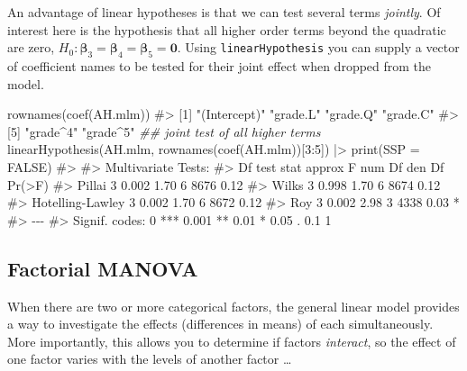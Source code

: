 \documentclass[
  letterpaper,
  10pt,
  krantz2]{krantz}
\makeatletter
\newenvironment{Shaded}{\begin{snugshade}}{\end{snugshade}}
\newcommand{\AttributeTok}[1]{\textcolor[rgb]{0.40,0.45,0.13}{#1}}
\newcommand{\CommentTok}[1]{\textcolor[rgb]{0.37,0.37,0.37}{#1}}
\newcommand{\ConstantTok}[1]{\textcolor[rgb]{0.56,0.35,0.01}{#1}}
\newcommand{\DecValTok}[1]{\textcolor[rgb]{0.68,0.00,0.00}{#1}}
\newcommand{\DocumentationTok}[1]{\textcolor[rgb]{0.37,0.37,0.37}{\textit{#1}}}
\newcommand{\FunctionTok}[1]{\textcolor[rgb]{0.28,0.35,0.67}{#1}}
\newcommand{\NormalTok}[1]{\textcolor[rgb]{0.00,0.23,0.31}{#1}}
\newcommand{\SpecialCharTok}[1]{\textcolor[rgb]{0.37,0.37,0.37}{#1}}
\newenvironment{kframe}{%
  \medskip{}
  \setlength{\fboxsep}{.8em}
  \def\at@end@of@kframe{}%
  \ifinner\ifhmode%
  \def\at@end@of@kframe{\end{minipage}}%
  \begin{minipage}{\columnwidth}%
  \fi\fi%
  \def\FrameCommand##1{\hskip\@totalleftmargin \hskip-\fboxsep
  \colorbox{shadecolor}{##1}\hskip-\fboxsep
      \hskip-\linewidth \hskip-\@totalleftmargin \hskip\columnwidth}%
  \MakeFramed {\advance\hsize-\width
    \@totalleftmargin\z@ \linewidth\hsize
    \@setminipage}}%
{\par\unskip\endMakeFramed%
  \at@end@of@kframe}
\renewenvironment{Shaded}{\begin{kframe}}{\end{kframe}}
\makeatother
\begin{document}
An advantage of linear hypotheses is that we can test several terms
\emph{jointly}. Of interest here is the hypothesis that all higher order
terms beyond the quadratic are zero,
\(H_0 : \boldsymbol{\beta}_3 =  \boldsymbol{\beta}_4 =  \boldsymbol{\beta}_5 = \boldsymbol{0}\).
Using \texttt{linearHypothesis} you can supply a vector of coefficient
names to be tested for their joint effect when dropped from the model.

\begin{Shaded}
\begin{Highlighting}[]
\FunctionTok{rownames}\NormalTok{(}\FunctionTok{coef}\NormalTok{(AH.mlm))}
\CommentTok{\#\textgreater{} [1] "(Intercept)" "grade.L"     "grade.Q"     "grade.C"    }
\CommentTok{\#\textgreater{} [5] "grade\^{}4"     "grade\^{}5"}
\DocumentationTok{\#\# joint test of all higher terms}
\FunctionTok{linearHypothesis}\NormalTok{(AH.mlm, }\FunctionTok{rownames}\NormalTok{(}\FunctionTok{coef}\NormalTok{(AH.mlm))[}\DecValTok{3}\SpecialCharTok{:}\DecValTok{5}\NormalTok{]) }\SpecialCharTok{|\textgreater{}} \FunctionTok{print}\NormalTok{(}\AttributeTok{SSP =} \ConstantTok{FALSE}\NormalTok{)}
\CommentTok{\#\textgreater{} }
\CommentTok{\#\textgreater{} Multivariate Tests: }
\CommentTok{\#\textgreater{}                  Df test stat approx F num Df den Df Pr(\textgreater{}F)  }
\CommentTok{\#\textgreater{} Pillai            3     0.002     1.70      6   8676   0.12  }
\CommentTok{\#\textgreater{} Wilks             3     0.998     1.70      6   8674   0.12  }
\CommentTok{\#\textgreater{} Hotelling{-}Lawley  3     0.002     1.70      6   8672   0.12  }
\CommentTok{\#\textgreater{} Roy               3     0.002     2.98      3   4338   0.03 *}
\CommentTok{\#\textgreater{} {-}{-}{-}}
\CommentTok{\#\textgreater{} Signif. codes:  0 \textquotesingle{}***\textquotesingle{} 0.001 \textquotesingle{}**\textquotesingle{} 0.01 \textquotesingle{}*\textquotesingle{} 0.05 \textquotesingle{}.\textquotesingle{} 0.1 \textquotesingle{} \textquotesingle{} 1}
\end{Highlighting}
\end{Shaded}

\subsection{Factorial MANOVA}\label{factorial-manova}

When there are two or more categorical factors, the general linear model
provides a way to investigate the effects (differences in means) of each
simultaneously. More importantly, this allows you to determine if
factors \emph{interact}, so the effect of one factor varies with the
levels of another factor \ldots{}
\end{document}
